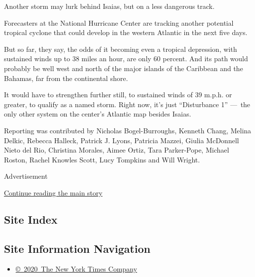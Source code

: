 Another storm may lurk behind Isaias, but on a less dangerous track.

Forecasters at the National Hurricane Center are tracking another
potential tropical cyclone that could develop in the western Atlantic in
the next five days.

But so far, they say, the odds of it becoming even a tropical
depression, with sustained winds up to 38 miles an hour, are only 60
percent. And its path would probably be well west and north of the major
islands of the Caribbean and the Bahamas, far from the continental
shore.

It would have to strengthen further still, to sustained winds of 39
m.p.h. or greater, to qualify as a named storm. Right now, it's just
``Disturbance 1'' ---~the only other system on the center's Atlantic map
besides Isaias.

Reporting was contributed by Nicholas Bogel-Burroughs, Kenneth Chang,
Melina Delkic, Rebecca Halleck, Patrick J. Lyons, Patricia Mazzei,
Giulia McDonnell Nieto del Rio, Christina Morales, Aimee Ortiz, Tara
Parker-Pope, Michael Roston, Rachel Knowles Scott, Lucy Tompkins and
Will Wright.

Advertisement

\protect\hyperlink{after-bottom}{Continue reading the main story}

\hypertarget{site-index}{%
\subsection{Site Index}\label{site-index}}

\hypertarget{site-information-navigation}{%
\subsection{Site Information
Navigation}\label{site-information-navigation}}

\begin{itemize}
\tightlist
\item
  \href{https://help.nytimes3xbfgragh.onion/hc/en-us/articles/115014792127-Copyright-notice}{©~2020~The
  New York Times Company}
\end{itemize}

